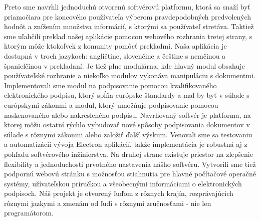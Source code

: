 \documentclass[thesismargins, english, thesislinespacing, onelinechapterstyle, upjsfrontpage]{rnthesis}
\begin{document}
Preto sme navrhli jednoduchú otvorenú softvérovú platformu, ktorá sa snaží byť priamočiara pre koncového používateľa výberom pravdepodobných predvolených hodnôt a znížením množstva informácií, s ktorými sa používateľ stretáva.
Taktiež sme uľahčili preklad našej aplikácie pomocou webového rozhrania tretej strany, s ktorým môže ktokoľvek z komunity pomôcť prekladmi.
Naša aplikácia je dostupná v troch jazykoch: angličtine, slovenčine a češtine s nemčinou a španielčinou v prekladaní.
Je tiež plne modulárna, kde hlavný modul obsahuje používateľské rozhranie a niekoľko modulov vykonáva manipuláciu s dokumentmi.
Implementovali sme modul na podpisovanie pomocou kvalifikovaného elektronického podpisu, ktorý spĺňa európske štandardy a mal by byť v súlade s európskymi zákonmi a modul, ktorý umožňuje podpisovanie pomocou naskenovaného alebo nakresleného podpisu.
Navrhovaný softvér je platforma, na ktorej môžu ostatní rýchlo vybudovať nové spôsoby podpisovania dokumentov v súlade s rôznymi zákonmi alebo založiť ďalší výskum.
Venovali sme sa testovaniu a automatizácii vývoja Electron aplikácií, takže implementácia je robustná aj z pohľadu softvérového inžinierstva.
Na druhej strane existuje priestor na zlepšenie flexibility a jednoduchosti prvotného nastavenia nášho softvéru.
Vytvorili sme tiež podpornú webovú stránku s možnosťou stiahnutia pre hlavné počítačové operačné systémy, užívateľskou príručkou a všeobecnými informáciami o elektronických podpisoch.
Náš projekt je otvorený ľuďom z rôznych krajín, rozprávajúcich rôznymi jazkymi a zmenám od ľudí s rôznymi zručnosťami - nie len programátorom.
\end{document}
